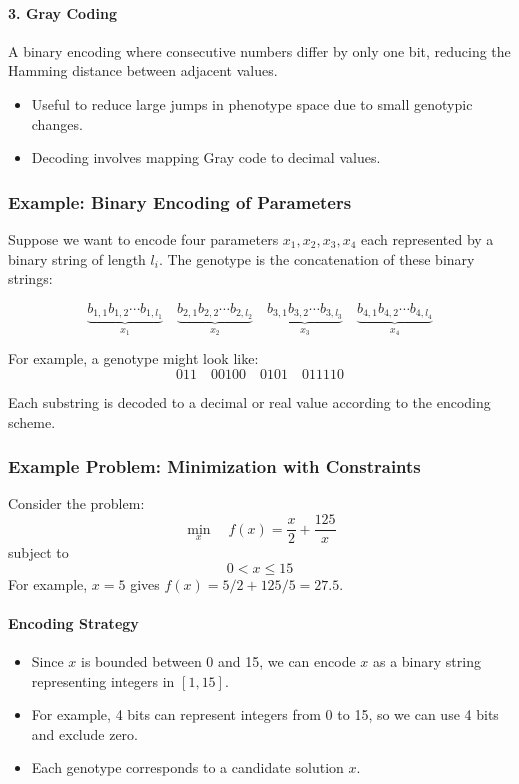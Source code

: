 \paragraph{3. Gray Coding}
A binary encoding where consecutive numbers differ by only one bit, reducing the Hamming distance between adjacent values.

\begin{itemize}
    \item Useful to reduce large jumps in phenotype space due to small genotypic changes.
    \item Decoding involves mapping Gray code to decimal values.
\end{itemize}

\subsubsection{Example: Binary Encoding of Parameters}
\label{sec:evo_example_binary_encoding_of_parameters_sub}

Suppose we want to encode four parameters \( x_1, x_2, x_3, x_4 \) each represented by a binary string of length \( l_i \). The genotype is the concatenation of these binary strings:

\[
\underbrace{b_{1,1} b_{1,2} \cdots b_{1, l_1}}_{x_1} \quad
\underbrace{b_{2,1} b_{2,2} \cdots b_{2, l_2}}_{x_2} \quad
\underbrace{b_{3,1} b_{3,2} \cdots b_{3, l_3}}_{x_3} \quad
\underbrace{b_{4,1} b_{4,2} \cdots b_{4, l_4}}_{x_4}
\]

For example, a genotype might look like:
\[
011 \quad 00100 \quad 0101 \quad 011110
\]

Each substring is decoded to a decimal or real value according to the encoding scheme.

\subsubsection{Example Problem: Minimization with Constraints}
\label{sec:evo_example_problem_minimization_with_constraints_sub}

Consider the problem:
\[
\min_{x} \quad f(x) = \frac{x}{2} + \frac{125}{x}
\]
subject to
\[
0 < x \leq 15
\]
For example, \(x=5\) gives \(f(x)=5/2+125/5=27.5\).

\paragraph{Encoding Strategy}
\begin{itemize}
    \item Since \( x \) is bounded between 0 and 15, we can encode \( x \) as a binary string representing integers in \([1, 15]\).
    \item For example, 4 bits can represent integers from 0 to 15, so we can use 4 bits and exclude zero.
    \item Each genotype corresponds to a candidate solution \( x \).
\end{itemize}

